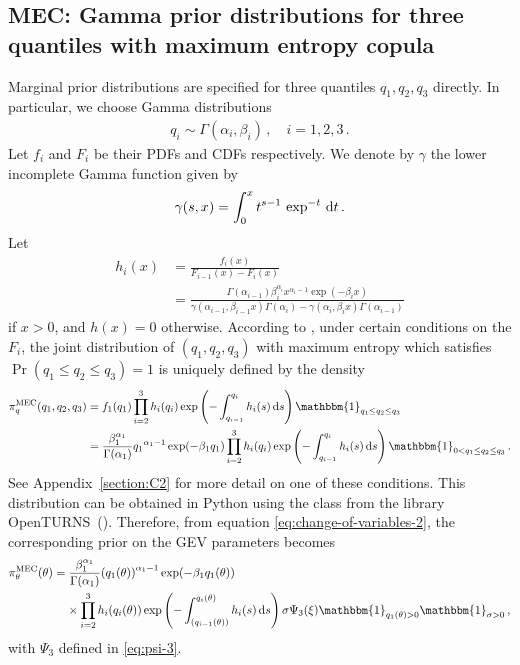 \documentclass{article}
\newcommand{\dd}{{\rm d}}
\begin{document}
\subsection{MEC:
	Gamma prior distributions for three quantiles with maximum entropy copula}
\label{section:prior-mec}
%

%
Marginal prior distributions are specified for three quantiles
$q_1, q_2, q_3$ directly.
In particular, we choose Gamma distributions
%
\begin{align*}
	q_i \sim \Gamma(\alpha_i, \beta_i) \,, \quad i = 1, 2, 3 \,.
\end{align*}
%
Let $f_i$ and $F_i$ be their PDFs and CDFs respectively.
We denote by $\gamma$ the lower incomplete Gamma function given by
%
\begin{align*}
\gamma(s, x) = \int_0^x t^{s - 1} \, \exp^{-t} \, \dd t \,.
\end{align*}
%
Let
%
\begin{align*}
	h_i(x) &= \frac{f_i(x)}{F_{i - 1}(x) - F_i(x)}\\
	&= \frac{\Gamma(\alpha_{i - 1})\beta_i ^ {\alpha_i} x ^ {\alpha_i - 1}
		\exp(-\beta_i x)}{\gamma(\alpha_{i - 1}, \beta_{i - 1} x)
		\Gamma(\alpha_{i}) - \gamma(\alpha_i, \beta_i x)\Gamma(\alpha_{i - 1})}
\end{align*}
%
if $x > 0$, and $h(x) = 0$ otherwise.
According to \cite{butucea2018},
under certain conditions on the $F_i$,
the joint distribution of $(q_1, q_2, q_3)$ with maximum entropy
which satisfies $\Pr(q_1 \leq q_2 \leq q_3) = 1$
is uniquely defined by the density
%
\begin{align*}
	\pi^{\text{MEC}}_q(q_1, q_2, q_3) &= f_1(q_1) \prod_{i=2}^3 h_i(q_i)
		\exp\left(-\int_{q_{i - 1}}^{q_i} h_i(s) \, \dd s\right)
		\mathbbm{1}_{q_1 \leq q_2 \leq q_3}\\
	&=\frac{\beta_1 ^ {\alpha_1}}{\Gamma(\alpha_1)} {q_1} ^ {\alpha_1 - 1}
		\exp(-\beta_1 q_1)\prod_{i=2}^3 h_i(q_i)
		\exp\left(-\int_{q_{i - 1}}^{q_i} h_i(s) \, \dd s\right)
		\mathbbm{1}_{0 < q_1 \leq q_2 \leq q_3} \,.
\end{align*}
%
See Appendix~\ref{section:C2} for more detail on one of these conditions.
This distribution can be obtained in Python using the class
from the library OpenTURNS~(\cite{OpenTURNS}).
Therefore, from equation \eqref{eq:change-of-variables-2},
the corresponding prior on the GEV parameters becomes
%
\begin{align}
	\pi^{\text{MEC}}_\theta(\theta)
		&=\frac{\beta_1 ^ {\alpha_1}}{\Gamma(\alpha_1)} {(q_1(\theta))}^{\alpha_1 - 1}
		\exp(-\beta_1 q_1(\theta)) \nonumber \\
	&\phantom{=}\ \times \prod_{i=2}^3 h_i(q_i(\theta))
		\exp\left(-\int_{(q_{i - 1}(\theta))}^{q_i(\theta)} h_i(s) \, \dd s\right)
		\sigma \Psi_3(\xi) \mathbbm{1}_{q_1(\theta) > 0} \mathbbm{1}_{\sigma > 0} \,,
\end{align}
%
with $\Psi_3$ defined in \eqref{eq:psi-3}.
%
\end{document}
